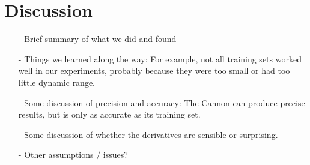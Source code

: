 \documentclass[onecolumn]{aastex62}
\begin{document}
\section{Discussion} \label{sec:discussion}

\begin{enumerate}
\item[-] Brief summary of what we did and found

\item[-] Things we learned along the way: For example, not all training sets worked well in our experiments, probably because they were too small or had too little dynamic range.

\item[-] Some discussion of precision and accuracy: The Cannon can produce precise results, but is only as accurate as its training set.

\item[-] Some discussion of whether the derivatives are sensible or surprising.

\item[-] Other assumptions / issues?
\end{enumerate}

\end{document}
